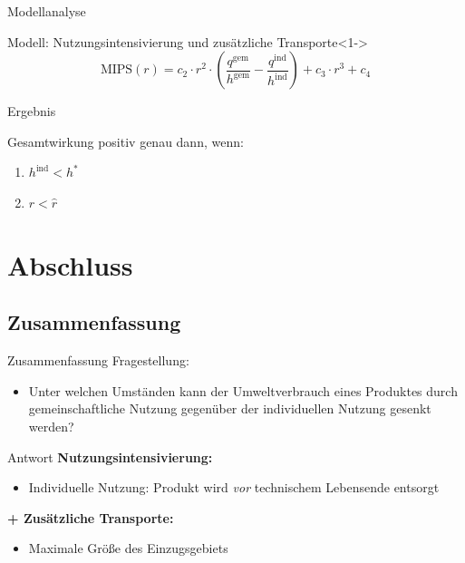 \documentclass[beamer, xcolor={table,usenames,dvipsnames}]{beamer}
\begin{document}
    \begin{frame}{Modellanalyse}
       	\begin{block}{Modell: Nutzungsintensivierung und zusätzliche Transporte}<1->
       		$$\text{MIPS}(r) = c_2 \cdot r^2 \cdot \left( \frac{q^\text{gem}}{h^\text{gem}} - \frac{q^\text{ind}}{h^\text{ind}} \right) + c_3 \cdot r^3 + c_4$$
       	\end{block}
    \end{frame}

    \begin{frame}{Ergebnis}
    	\begin{block}{}
            Gesamtwirkung positiv genau dann, wenn:
    		\begin{enumerate}
 			    \item $h^\text{ind} < h^* $
 			    \item $r < \hat{r}$
    		\end{enumerate}
    	\end{block}
    \end{frame}    

    \section{Abschluss}
    \subsection{Zusammenfassung}
	\begin{frame}{Zusammenfassung}
		\pause
		Fragestellung:
		\begin{itemize}
			\item Unter welchen Umständen kann der Umweltverbrauch eines Produktes durch gemeinschaftliche Nutzung gegenüber der individuellen Nutzung gesenkt werden?
		\end{itemize}
		\pause
		\begin{block}{Antwort}
			\textbf{Nutzungsintensivierung:}
			\begin{itemize}
				\item Individuelle Nutzung: Produkt wird \emph{vor} technischem Lebensende entsorgt  
			\end{itemize}
			\pause
			\textbf{+ Zusätzliche Transporte:}
			\begin{itemize}
				\item Maximale Größe des Einzugsgebiets
			\end{itemize}
		\end{block}
	\end{frame}
\end{document}
